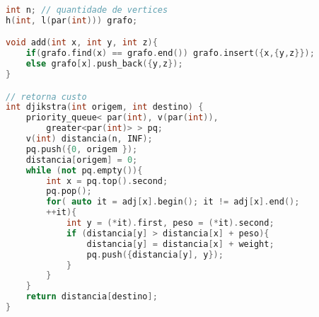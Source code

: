 


\begin{lstlisting}[language=C++, title=Usando fila de prioridade]
int n; // quantidade de vertices
h(int, l(par(int))) grafo;

void add(int x, int y, int z){
    if(grafo.find(x) == grafo.end()) grafo.insert({x,{y,z}});
    else grafo[x].push_back({y,z});
}

// retorna custo
int djikstra(int origem, int destino) {
    priority_queue< par(int), v(par(int)), 
        greater<par(int)> > pq;
    v(int) distancia(n, INF);
    pq.push({0, origem });
    distancia[origem] = 0;
    while (not pq.empty()){
        int x = pq.top().second;
        pq.pop();
        for( auto it = adj[x].begin(); it != adj[x].end(); 
        ++it){
            int y = (*it).first, peso = (*it).second;
            if (distancia[y] > distancia[x] + peso){
                distancia[y] = distancia[x] + weight;
                pq.push({distancia[y], y});
            }
        }
    }
    return distancia[destino];
}
\end{lstlisting}
\newpage